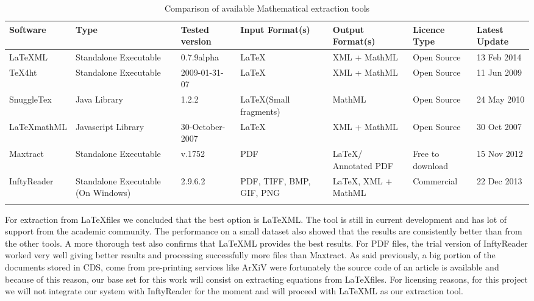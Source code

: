 \begin{longtable}{|>{\centering\arraybackslash}
m{2.93cm}|>{\centering\arraybackslash}
m{1.8cm}|>{\centering\arraybackslash}
m{1.6cm}|>{\centering\arraybackslash}
m{1.9cm}|>{\centering\arraybackslash}
m{1.6cm}|>{\centering\arraybackslash}
m{1.8cm}|>{\centering\arraybackslash}
m{1.4cm}|
}
\hline 
\small{\textbf{Software}} & \small{\textbf{Type}} & \small{\textbf{Tested version}} & \small{\textbf{Input Format(s)}} & \small{\textbf{Output Format(s)}} & \small{\textbf{Licence Type}} & \small{\textbf{Latest Update}}  \\
\hline
\small{LaTeXML}\cite{latexml} & \small{Standalone Executable} & \small{0.7.9alpha} & \small{\LaTeX} & \small{XML + MathML} & \small{Open Source} & \small{13 Feb 2014}  \\
\hline
\small{TeX4ht}\cite{tex4ht2} & \small{Standalone Executable} & \small{ 2009-01-31-07} & \small{\LaTeX} & \small{XML + MathML} & \small{ Open Source} & \small{11 Jun 2009}  \\
\hline
\small{SnuggleTex}\cite{snuggletex} & \small{Java Library} & \small{1.2.2} & \small{\LaTeX (Small fragments)} & \small{MathML} & \small{Open Source} & \small{24 May 2010}  \\
\hline
\small{LaTeXmathML}\cite{latexmathml} & \small{Javascript Library} & \small{30-October-2007} & \small{\LaTeX} & \small{XML + MathML} & \small{Open Source} & \small{30 Oct 2007}  \\
\hline
\small{Maxtract}\cite{maxtract1}\cite{maxtract2} & \small{Standalone Executable} & \small{v.1752} & \small{PDF} & \small{\LaTeX / Annotated PDF} & \small{Free to download} & \small{15 Nov 2012}  \\
\hline
\small{InftyReader}\cite{infty1}\cite{infty2} & \small{Standalone Executable (On Windows)} & \small{2.9.6.2} & \small{PDF, TIFF, BMP, GIF, PNG} & \small{\LaTeX, XML + MathML} & \small{Commercial} & \small{22 Dec 2013}  \\

\hline
\caption{Comparison of available Mathematical extraction tools}
\label{math_extraction_tools}
\end{longtable}

For extraction from \LaTeX  files we concluded that the best option is LaTeXML. The tool is still in current development and has lot of support from the academic community. The performance on a small dataset also showed that the results are consistently better than from the other tools. A more thorough test\cite{latexcomparison} also confirms that LaTeXML provides the best results. For PDF files, the trial version of InftyReader worked very well giving better results and processing successfully more files than Maxtract. As said previously, a big portion of the documents stored in CDS, come from pre-printing services like ArXiV were fortunately the source code of an article is available and because of this reason, our base set for this work will consist on extracting equations from \LaTeX files. For licensing reasons, for this project we will not integrate our system with InftyReader for the moment and will proceed with LaTeXML as our extraction tool.



